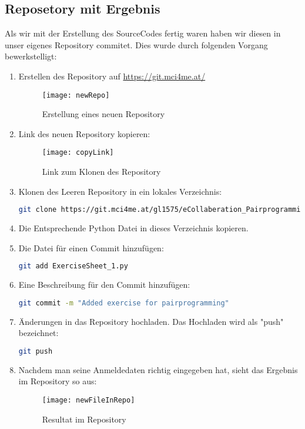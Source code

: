 \documentclass[12pt]{article}
\begin{document}
\subsection{Reposetory mit Ergebnis}
Als wir mit der Erstellung des SourceCodes fertig waren haben wir diesen in unser eigenes Repository commitet. Dies wurde durch folgenden Vorgang bewerkstelligt:
\begin{enumerate}
 \item Erstellen des Repository auf \url{https://git.mci4me.at/}
 \begin{figure}[h]
  \begin{center}
   \texttt{[image: newRepo]}
   \caption{Erstellung eines neuen Repository}
  \end{center}
 \end{figure}
 \item Link des neuen Repository kopieren:
 \begin{figure}[h]
  \begin{center}
   \texttt{[image: copyLink]}
   \caption{Link zum Klonen des Repository}
  \end{center}
 \end{figure}
 \item Klonen des Leeren Repository in ein lokales Verzeichnis:
 \begin{lstlisting}[caption={CLI Kommando zum Klonen eines Repository},language=Bash,frame=single]
  git clone https://git.mci4me.at/gl1575/eCollaberation_Pairprogramming.git
 \end{lstlisting}
  \item Die Entsprechende Python Datei in dieses Verzeichnis kopieren.
  \item Die Datei für einen Commit hinzufügen:
  \begin{lstlisting}[caption={CLI Kommando zum Hinzufügen einer Datei für einen Commit},language=Bash,frame=single]
  git add ExerciseSheet_1.py
 \end{lstlisting}
 \item Eine Beschreibung für den Commit hinzufügen:
 \begin{lstlisting}[caption={CLI Kommando zum Hinzufügen einer Beschreibung für einen Commit},language=Bash,frame=single]
  git commit -m "Added exercise for pairprogramming"
 \end{lstlisting}
 \item Änderungen in das Repository hochladen. Das Hochladen wird als "push" bezeichnet:
 \begin{lstlisting}[caption={Hochladen der Änderungen},language=Bash,frame=single]
  git push
 \end{lstlisting}
 \item Nachdem man seine Anmeldedaten richtig eingegeben hat, sieht das Ergebnis im Repository so aus:
 \begin{figure}[h]
  \begin{center}
   \texttt{[image: newFileInRepo]}
   \caption{Resultat im Repository}
  \end{center}
 \end{figure}
 \end{enumerate}
\pagebreak
\end{document}
